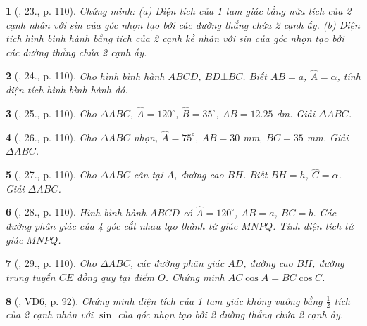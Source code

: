 \documentclass{article}
\newtheorem{baitoan}{}
\begin{document}
\begin{baitoan}[\cite{Tuyen_Toan_9_old}, 23., p. 110]
	Chứng minh: (a) Diện tích của 1 tam giác bằng nửa tích của 2 cạnh nhân với sin của góc nhọn tạo bởi các đường thẳng chứa 2 cạnh ấy. (b) Diện tích hình bình hành bằng tích của 2 cạnh kề nhân với sin của góc nhọn tạo bởi các đường thẳng chứa 2 cạnh ấy.
\end{baitoan}

\begin{baitoan}[\cite{Tuyen_Toan_9_old}, 24., p. 110]
	Cho hình bình hành $ABCD$, $BD\bot BC$. Biết $AB = a$, $\widehat{A} = \alpha$, tính diện tích hình bình hành đó.
\end{baitoan}

\begin{baitoan}[\cite{Tuyen_Toan_9_old}, 25., p. 110]
	Cho $\Delta ABC$, $\widehat{A} = 120^\circ$, $\widehat{B} = 35^\circ$, $AB = 12.25$ \emph{dm}. Giải $\Delta ABC$.
\end{baitoan}

\begin{baitoan}[\cite{Tuyen_Toan_9_old}, 26., p. 110]
	Cho $\Delta ABC$ nhọn, $\widehat{A} = 75^\circ$, $AB = 30$ \emph{mm}, $BC = 35$ \emph{mm}. Giải $\Delta ABC$.
\end{baitoan}

\begin{baitoan}[\cite{Tuyen_Toan_9_old}, 27., p. 110]
	Cho $\Delta ABC$ cân tại $A$, đường cao $BH$. Biết $BH = h$, $\widehat{C} = \alpha$. Giải $\Delta ABC$.
\end{baitoan}

\begin{baitoan}[\cite{Tuyen_Toan_9_old}, 28., p. 110]
	Hình bình hành $ABCD$ có $\widehat{A} = 120^\circ$, $AB = a$, $BC = b$. Các đường phân giác của 4 góc cắt nhau tạo thành tứ giác $MNPQ$. Tính diện tích tứ giác $MNPQ$.
\end{baitoan}

\begin{baitoan}[\cite{Tuyen_Toan_9_old}, 29., p. 110]
	Cho $\Delta ABC$, các đường phân giác $AD$, đường cao $BH$, đường trung tuyến $CE$ đồng quy tại điểm $O$. Chứng minh $AC\cos A = BC\cos C$.
\end{baitoan}

\begin{baitoan}[\cite{Binh_Toan_9_tap_1}, VD6, p. 92]
	Chứng minh diện tích của 1 tam giác không vuông bằng $\frac{1}{2}$ tích của 2 cạnh nhân với $\sin$ của góc nhọn tạo bởi 2 đường thẳng chứa 2 cạnh ấy.
\end{baitoan}
\end{document}

